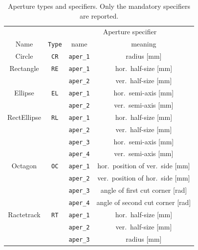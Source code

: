 \begin{center}
\begin{longtable}{|c|c|c|c|}%
    \caption{Aperture types and specifiers. Only the mandatory specifiers are reported.}
    \label{tab:apeSpecs} \\*
    \hline
    \rowcolor{blue!30}
    & & \multicolumn{2}{|c|}{Aperture specifier} \\*
    \rowcolor{blue!30}
    Name & \texttt{Type} & name & meaning \\*
    \hline
    \endfirsthead

    Circle  & \texttt{CR} & \texttt{aper\_1} & radius [mm] \\*
    \hline

    Rectangle & \texttt{RE} & \texttt{aper\_1} & hor.~half-size [mm] \\*
    & & \texttt{aper\_2} & ver.~half-size [mm] \\*
    \hline
    
    Ellipse & \texttt{EL} & \texttt{aper\_1} & hor.~semi-axis [mm] \\*
    & & \texttt{aper\_2} & ver.~semi-axis [mm] \\*
    \hline
    
    RectEllipse & \texttt{RL} & \texttt{aper\_1} & hor.~half-size [mm] \\*
    & & \texttt{aper\_2} & ver.~half-size [mm] \\*
    & & \texttt{aper\_3} & hor.~semi-axis [mm] \\*
    & & \texttt{aper\_4} & ver.~semi-axis [mm] \\*
    \hline
    
    Octagon & \texttt{OC} & \texttt{aper\_1} & hor.~position of ver.~side [mm] \\*
    & & \texttt{aper\_2} & ver.~position of hor.~side [mm] \\*
    & & \texttt{aper\_3} & angle of first cut corner [rad] \\*
    & & \texttt{aper\_4} & angle of second cut corner [rad] \\*
    \hline
    
    Ractetrack & \texttt{RT} & \texttt{aper\_1} & hor.~half-size [mm] \\*
    & & \texttt{aper\_2} & ver.~half-size [mm] \\*
    & & \texttt{aper\_3} & radius [mm] \\*
    \hline
    

\end{longtable}
\end{center}
